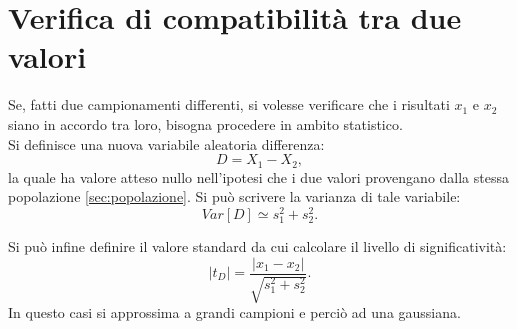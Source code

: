\section{Verifica di compatibilità tra due valori} %
\label{sec:test-due-valori}
Se, fatti due campionamenti differenti, si volesse verificare che i risultati $x_1$ e $x_2$ siano in accordo tra loro, bisogna procedere in ambito statistico. \\ Si definisce una nuova variabile aleatoria differenza:
\begin{equation}
D=X_1-X_2,
\end{equation}
la quale ha valore atteso nullo nell'ipotesi che i due valori provengano dalla stessa popolazione \ref{sec:popolazione}. Si può scrivere la varianza di tale variabile:
\begin{equation}
Var\left[ D \right] \simeq { s }_{ 1 }^{ 2 }+{ s }_{ 2 }^{ 2 }.
\end{equation}

Si può infine definire il valore standard da cui calcolare il livello di significatività:
\begin{equation}
\label{eq:valore-stand-due-valori}
\left| { t }_{ D } \right| =\frac { \left| { x }_{ 1 }-{ x }_{ 2 } \right|  }{ \sqrt { { s }_{ 1 }^{ 2 }+{ s }_{ 2 }^{ 2 } }  } .
\end{equation}
In questo casi si approssima a grandi campioni e perciò ad una gaussiana.

